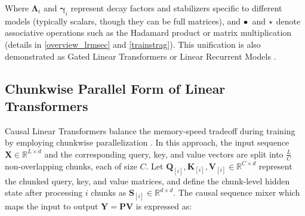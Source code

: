 \hspace{-0.3cm}

Where \(\boldsymbol{\Lambda}_i\) and \(\boldsymbol{\gamma}_i\) represent decay factors and stabilizers specific to different models (typically scalars, though they can be full matrices), and \(\tikz\draw[white,fill=black] (0,0) circle (.5ex);\hspace{0.5mm}\) and \(\textcolor{black}{\star}\) denote associative operations such as the Hadamard product or matrix multiplication (details in \cref{overview_lrmsec} and \ref{trainstrag}). This unification is also demonstrated as Gated Linear Transformers \cite{yang2023gated} or Linear Recurrent Models \cite{deltanet}.

\subsection{Chunkwise Parallel Form of Linear Transformers}

Causal Linear Transformers balance the memory-speed tradeoff during training by employing chunkwise parallelization \cite{yang2023gated,deltanet,mamba2}. In this approach, the input sequence \(\mathbf{X} \in \mathbb{R}^{L \times d}\) and the corresponding query, key, and value vectors are split into \(\frac{L}{C}\) non-overlapping chunks, each of size \(C\). Let \(\mathbf{Q}_{[i]}, \mathbf{K}_{[i]}, \mathbf{V}_{[i]} \in \mathbb{R}^{C \times d}\) represent the chunked query, key, and value matrices, and define the chunk-level hidden state after processing \(i\) chunks as \(\mathbf{S}_{[i]} \in \mathbb{R}^{d \times d}\). The causal sequence mixer which maps the input to output \( \mathbf{Y} = \mathbf{P}\mathbf{V}\) is expressed as:

